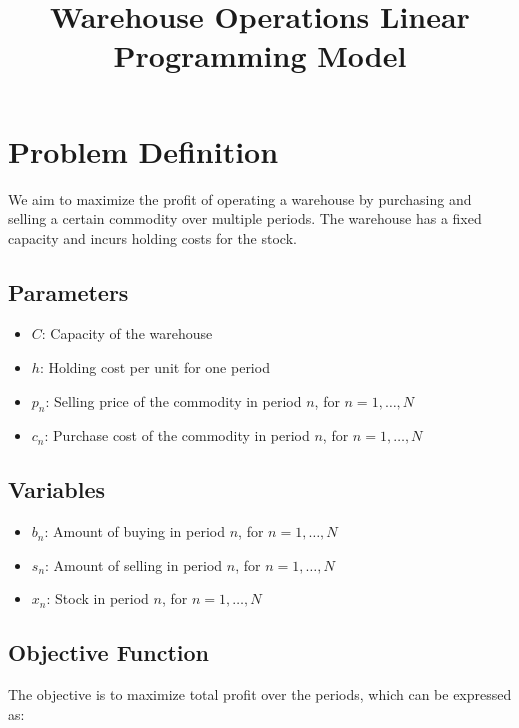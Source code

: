 \documentclass{article}
\begin{document}
\title{Warehouse Operations Linear Programming Model}
\author{}
\date{}
\maketitle

\section*{Problem Definition}

We aim to maximize the profit of operating a warehouse by purchasing and selling a certain commodity over multiple periods. The warehouse has a fixed capacity and incurs holding costs for the stock.

\subsection*{Parameters}

\begin{itemize}
    \item $C$: Capacity of the warehouse
    \item $h$: Holding cost per unit for one period
    \item $p_n$: Selling price of the commodity in period $n$, for $n = 1, \ldots, N$
    \item $c_n$: Purchase cost of the commodity in period $n$, for $n = 1, \ldots, N$
\end{itemize}

\subsection*{Variables}

\begin{itemize}
    \item $b_n$: Amount of buying in period $n$, for $n = 1, \ldots, N$
    \item $s_n$: Amount of selling in period $n$, for $n = 1, \ldots, N$
    \item $x_n$: Stock in period $n$, for $n = 1, \ldots, N$
\end{itemize}

\subsection*{Objective Function}

The objective is to maximize total profit over the periods, which can be expressed as:
\end{document}
